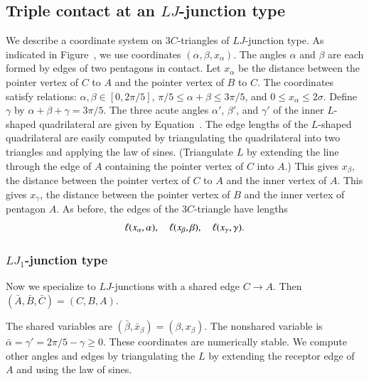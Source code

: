 \subsection{Triple contact at an $LJ$-junction type}

We describe a coordinate system on $3C$-triangles of $LJ$-junction
type.  As indicated in Figure~, we use coordinates
$(\alpha,\beta,x_\alpha)$.  The angles $\alpha$ and $\beta$ are each
formed by edges of two pentagons in contact.  Let $x_\alpha$ be the
distance between the pointer vertex of $C$ to $A$ and the pointer
vertex of $B$ to $C$.  The coordinates satisfy relations:
$\alpha,\beta\in [0,2\pi/5]$, $\pi/5\le\alpha+\beta\le 3\pi/5$, and
$0\le x_\alpha\le 2\sigma$.  Define $\gamma$ by
$\alpha+\beta+\gamma=3\pi/5$.  The three acute angles $\alpha'$,
$\beta'$, and $\gamma'$ of the inner $L$-shaped quadrilateral are
given by Equation~.  The edge lengths of the $L$-shaped
quadrilateral are easily computed by triangulating the quadrilateral
into two triangles and applying the law of sines.  (Triangulate $L$ by
extending the line through the edge of $A$ containing the pointer
vertex of $C$ into $A$.)  This gives $x_\beta$, the distance between
the pointer vertex of $C$ to $A$ and the inner vertex of $A$.  This
gives $x_\gamma$, the distance between the pointer vertex of $B$ and
the inner vertex of pentagon $A$.  As before, the edges of the
$3C$-triangle have lengths
\[
\ell(x_\alpha,\alpha),\quad \ell(x_\beta,\beta),\quad \ell(x_\gamma,\gamma).
\]


\subsubsection{$LJ_1$-junction type}

Now we specialize to $LJ$-junctions with a shared edge $C\to A$.
Then $(\bar A,\bar B,\bar C)=(C,B,A)$.

The shared variables are $(\bar \beta,\bar x_\beta)=(\beta,x_\beta)$.
The nonshared variable is $\bar\alpha=\gamma' = 2\pi/5-\gamma\ge0$.
These coordinates are numerically stable.  We compute other angles and
edges by triangulating the $L$ by extending the receptor edge of $A$
and using the law of sines.

